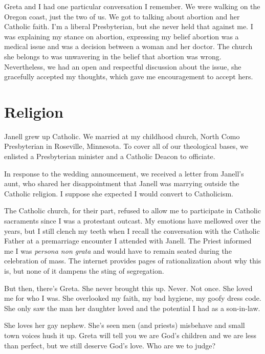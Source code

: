\documentclass[
  letterpaper,
  DIV=11,
  numbers=noendperiod]{scrreprt}
\begin{document}
Greta and I had one particular conversation I remember. We were walking
on the Oregon coast, just the two of us. We got to talking about
abortion and her Catholic faith. I'm a liberal Presbyterian, but she
never held that against me. I was explaining my stance on abortion,
expressing my belief abortion was a medical issue and was a decision
between a woman and her doctor. The church she belongs to was unwavering
in the belief that abortion was wrong. Nevertheless, we had an open and
respectful discussion about the issue, she gracefully accepted my
thoughts, which gave me encouragement to accept hers.

\section*{Religion}\label{religion}


Janell grew up Catholic. We married at my childhood church, North Como
Presbyterian in Roseville, Minnesota. To cover all of our theological
bases, we enlisted a Presbyterian minister and a Catholic Deacon to
officiate.

In response to the wedding announcement, we received a letter from
Janell's aunt, who shared her disappointment that Janell was marrying
outside the Catholic religion. I suppose she expected I would convert to
Catholicism.

The Catholic church, for their part, refused to allow me to participate
in Catholic sacraments since I was a protestant outcast. My emotions
have mellowed over the years, but I still clench my teeth when I recall
the conversation with the Catholic Father at a premarriage encounter I
attended with Janell. The Priest informed me I was \emph{persona non
grata} and would have to remain seated during the celebration of mass.
The internet provides pages of rationalization about why this is, but
none of it dampens the sting of segregation.

But then, there's Greta. She never brought this up. Never. Not once. She
loved me for who I was. She overlooked my faith, my bad hygiene, my
goofy dress code. She only saw the man her daughter loved and the
potential I had as a son-in-law.

She loves her gay nephew. She's seen men (and priests) misbehave and
small town voices hush it up. Greta will tell you we are God's children
and we are less than perfect, but we still deserve God's love. Who are
we to judge?
\end{document}
